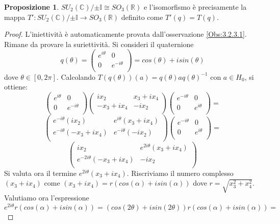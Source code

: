 \documentclass[12pt,a4paper]{report}
\theoremstyle{definition}
\theoremstyle{Theorem}
\newtheorem{Prop}[Def]{Proposizione}
\theoremstyle{definition}
\theoremstyle{definition}
\theoremstyle{definition}
\begin{document}
\begin{Prop}
	$SU_2(\mathbb{C})/{\pm \mathbb{I}}\cong SO_3(\mathbb{R})$ e l'isomorfismo è precisamente la mappa $T':SU_2(\mathbb{C})/{\pm \mathbb{I}}\longrightarrow SO_3(\mathbb{R})$ definito come $T'(q)=T(q)$.
\end{Prop}
\begin{proof}
	L'iniettività è automaticamente provata dall'osservazione \ref{Obs:3.2.3.1}. Rimane da provare la suriettività.
	Si consideri il quaternione 
	$$q(\theta)=
	\begin{pmatrix}
		e^{i\theta} & 0\\
		0 & e^{-i\theta}\\
	\end{pmatrix}=cos(\theta)+isin(\theta)$$
dove $\theta\in [0,2\pi]$. Calcolando $T(q(\theta))(a)=q(\theta)aq(\theta)^{-1}$ con $a\in H_0$, si ottiene:
$$\begin{pmatrix}
	e^{i\theta} & 0\\
	0 & e^{-i\theta}\\
\end{pmatrix}
\begin{pmatrix}
	ix_2 & x_3+ix_4\\
	-x_3+ix_4 & -ix_2\\
\end{pmatrix}
\begin{pmatrix}
e^{-i\theta} & 0\\
0 & e^{i\theta}\\
\end{pmatrix}=$$
$$\begin{pmatrix}
	e^{-i\theta}(ix_2) & e^{i\theta}(x_3+ix_4)\\
	e^{-i\theta}(-x_3+ix_4) & e^{-i\theta}(-ix_2)\\
\end{pmatrix}
\begin{pmatrix}
	e^{-i\theta} & 0\\
	0 & e^{i\theta}\\
\end{pmatrix}=$$
$$\begin{pmatrix}
	ix_2 & e^{2i\theta}(x_3+ix_4)\\
	e^{-2i\theta}(-x_3+ix_4) & -ix_2\\
\end{pmatrix}$$
Si valuta ora il termine $e^{2i\theta}(x_3+ix_4)$. Riscriviamo il numero complesso $(x_3+ix_4)$ come $(x_3+ix_4)=r(cos(\alpha)+isin(\alpha))$ dove $r=\sqrt{x_3^2+x_4^2}$. Valutiamo ora l'espressione 
$$e^{2i\theta}r(cos(\alpha)+isin(\alpha))=
(cos(2\theta)+isin(2\theta))r(cos(\alpha)+isin(\alpha))=$$

\end{proof}
\end{document}
